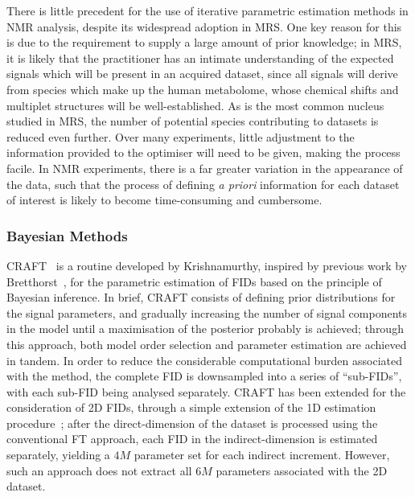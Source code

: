 There is little precedent for the use of iterative parametric estimation
methods \label{corr:varpro-amares}
in \ac{NMR} analysis, despite its widespread adoption in \ac{MRS}. One key reason
for this is due to the requirement to supply a large amount of prior knowledge;
in \ac{MRS}, it is likely that the practitioner has an intimate understanding
of the expected signals
which will be present in an acquired dataset, since all signals will derive
from species which make up the human metabolome, whose chemical shifts and multiplet
structures will be well-established. As  is the most
common nucleus studied in \ac{MRS}, the number of potential species
contributing to datasets is reduced even further. Over many experiments, little
adjustment to the information provided to the optimiser will need to be given,
making the process facile. In \ac{NMR} experiments, there is a far greater
variation in the appearance of the data, such that the process of defining
\textit{a priori} information for each dataset of interest is likely to become
time-consuming and cumbersome.

\subsubsection{Bayesian Methods}
\Ac{CRAFT}~\cite{Krishnamurthy2013,Krishnamurthy2021} is a routine developed by
Krishnamurthy, inspired by previous work by
Bretthorst~\cite{Bretthorst1990a,Bretthorst1990b,Bretthorst1990c,Bretthorst1991,Bretthorst1992},
for the parametric estimation of \acp{FID} based on the principle of Bayesian
inference.
In brief, \ac{CRAFT} consists of defining prior distributions for the signal
parameters, and gradually increasing the number of signal components in the
model until a maximisation of the posterior probably is achieved; through this
approach, both model order selection and parameter estimation are achieved
in tandem. In order to reduce the considerable computational burden associated
with the method, the complete \ac{FID} is downsampled into a series of
``sub-\acp{FID}'', with each sub-\ac{FID} being analysed separately.
\ac{CRAFT} has been extended for the consideration of \ac{2D} \acp{FID},
through a simple extension of the \ac{1D} estimation
procedure~\cite{Krishnamurthy2017}; after the direct-dimension of the dataset is
processed using the conventional \ac{FT} approach, each \ac{FID} in the
indirect-dimension is estimated separately, yielding a $4M$ parameter
set for each indirect increment. However, such an approach does not
extract all $6M$ parameters associated with the \ac{2D} dataset.

